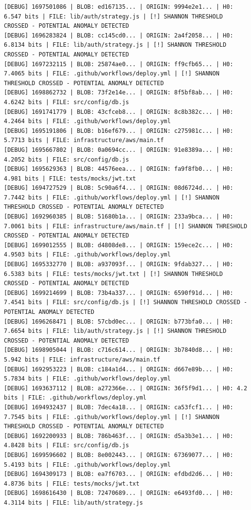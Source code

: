 \documentclass[12pt, a4paper, oneside]{report}
\begin{document}
\begin{lstlisting}[basicstyle=\tiny\ttfamily]
[DEBUG] 1697501086 | BLOB: ed167135... | ORIGIN: 9994e2e1... | H0: 6.547 bits | FILE: lib/auth/strategy.js | [!] SHANNON THRESHOLD CROSSED - POTENTIAL ANOMALY DETECTED
[DEBUG] 1696283824 | BLOB: cc145cd0... | ORIGIN: 2a4f2058... | H0: 6.8134 bits | FILE: lib/auth/strategy.js | [!] SHANNON THRESHOLD CROSSED - POTENTIAL ANOMALY DETECTED
[DEBUG] 1697232115 | BLOB: 25874ae0... | ORIGIN: ff9cfb65... | H0: 7.4065 bits | FILE: .github/workflows/deploy.yml | [!] SHANNON THRESHOLD CROSSED - POTENTIAL ANOMALY DETECTED
[DEBUG] 1698862732 | BLOB: 73f2e14e... | ORIGIN: 8f5bf8ab... | H0: 4.6242 bits | FILE: src/config/db.js
[DEBUG] 1691741779 | BLOB: 43cfceb8... | ORIGIN: 8c8b382c... | H0: 4.2464 bits | FILE: .github/workflows/deploy.yml
[DEBUG] 1695191806 | BLOB: b16ef679... | ORIGIN: c275981c... | H0: 5.7713 bits | FILE: infrastructure/aws/main.tf
[DEBUG] 1695667802 | BLOB: 0a0694cc... | ORIGIN: 91e8389a... | H0: 4.2052 bits | FILE: src/config/db.js
[DEBUG] 1695629363 | BLOB: 44576eea... | ORIGIN: fa9f8fb0... | H0: 4.981 bits | FILE: tests/mocks/jwt.txt
[DEBUG] 1694727529 | BLOB: 5c90a6f4... | ORIGIN: 08d6724d... | H0: 7.7442 bits | FILE: .github/workflows/deploy.yml | [!] SHANNON THRESHOLD CROSSED - POTENTIAL ANOMALY DETECTED
[DEBUG] 1692960385 | BLOB: 51680b1a... | ORIGIN: 233a9bca... | H0: 7.0061 bits | FILE: infrastructure/aws/main.tf | [!] SHANNON THRESHOLD CROSSED - POTENTIAL ANOMALY DETECTED
[DEBUG] 1699012555 | BLOB: d4808de8... | ORIGIN: 159ece2c... | H0: 4.9503 bits | FILE: .github/workflows/deploy.yml
[DEBUG] 1695332770 | BLOB: a937093f... | ORIGIN: 9fdab327... | H0: 6.5383 bits | FILE: tests/mocks/jwt.txt | [!] SHANNON THRESHOLD CROSSED - POTENTIAL ANOMALY DETECTED
[DEBUG] 1699214699 | BLOB: 73b4a337... | ORIGIN: 6590f91d... | H0: 7.4541 bits | FILE: src/config/db.js | [!] SHANNON THRESHOLD CROSSED - POTENTIAL ANOMALY DETECTED
[DEBUG] 1696268471 | BLOB: 57cbd0ec... | ORIGIN: b773bfa0... | H0: 7.6654 bits | FILE: lib/auth/strategy.js | [!] SHANNON THRESHOLD CROSSED - POTENTIAL ANOMALY DETECTED
[DEBUG] 1698905044 | BLOB: c716c614... | ORIGIN: 3b7840d8... | H0: 5.942 bits | FILE: infrastructure/aws/main.tf
[DEBUG] 1692953223 | BLOB: c184a1d4... | ORIGIN: d667e89b... | H0: 5.7834 bits | FILE: .github/workflows/deploy.yml
[DEBUG] 1693637112 | BLOB: a272366e... | ORIGIN: 36f5f9d1... | H0: 4.2 bits | FILE: .github/workflows/deploy.yml
[DEBUG] 1694932437 | BLOB: 7dec4a18... | ORIGIN: ca53fcf1... | H0: 7.7545 bits | FILE: .github/workflows/deploy.yml | [!] SHANNON THRESHOLD CROSSED - POTENTIAL ANOMALY DETECTED
[DEBUG] 1692200933 | BLOB: 786b463f... | ORIGIN: d5a3b3e1... | H0: 4.8428 bits | FILE: src/config/db.js
[DEBUG] 1699596602 | BLOB: 8e002443... | ORIGIN: 67369077... | H0: 5.4193 bits | FILE: .github/workflows/deploy.yml
[DEBUG] 1694309173 | BLOB: ea7f6703... | ORIGIN: efdbd2d6... | H0: 4.8736 bits | FILE: tests/mocks/jwt.txt
[DEBUG] 1698616430 | BLOB: 72470689... | ORIGIN: e6493fd0... | H0: 4.3114 bits | FILE: lib/auth/strategy.js
\end{lstlisting}
\end{document}
